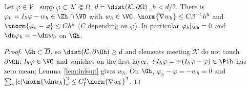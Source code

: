 \begin{lemma}\label{nb:test}
Let $\varphi\in\mathcal V$, $\operatorname{supp}\varphi\subset\mathcal K\Subset\Omega$, $d=\dist(\mathcal K,\partial\Omega)$, $h<d/2$. There is $\varphi_h=I_h\varphi-w_h\in\Zh\cap\VO$ with $w_h\in\VO$,
$\norm{\nabla w_h}\le C\beta^{-1}h^k$ and $\tnorm{\varphi_h-\varphi}\le Ch^k$ ($C$ depending on $\varphi$). In particular $\varphi_h|_{\Gh}=0$ and $\dn\varphi_h=-\dn w_h$ on $\Gh$.
\end{lemma}
\begin{proof}
$\Gh\subset\overline D$, so $\dist(\mathcal K,\partial\Oh)\ge d$ and elements meeting $\mathcal K$ do not touch $\partial\Oh$: $I_h\varphi\in\VO$ and vanishes on the first layer.
$\div I_h\varphi=\div(I_h\varphi-\varphi)\in\Pih$ has zero mean; Lemma~\ref{lem:infsup} gives $w_h$. On $\Gh$, $\varphi_h-\varphi=-w_h=0$ and $\sum_e|e|\norm{\dn w_h}^2_e\le C_I^2\norm{\nabla w_h}^2$.
\end{proof}

